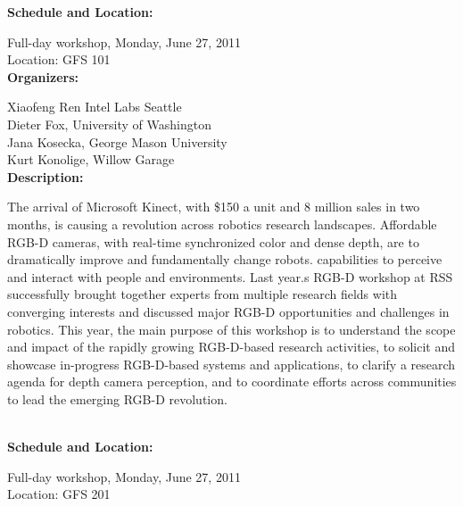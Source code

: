 {{\bf  Schedule and Location:}

Full-day workshop, Monday, June 27, 2011\\
Location: GFS 101 \\[4mm]

{\bf  Organizers:}

Xiaofeng Ren Intel Labs Seattle\\
Dieter Fox, University of Washington\\
Jana Kosecka, George Mason University\\
Kurt Konolige, Willow Garage\\[4mm]

{\bf Description: }

The arrival of Microsoft Kinect, with \$150 a unit and 8 million sales in two months, is causing a revolution across robotics research landscapes. Affordable RGB-D cameras, with real-time synchronized color and dense depth, are to dramatically improve and fundamentally change robots. capabilities to perceive and interact with people and environments. Last year.s RGB-D workshop at RSS successfully brought together experts from multiple research fields with converging interests and discussed major RGB-D opportunities and challenges in robotics. This year, the main purpose of this workshop is to understand the scope and impact of the rapidly growing RGB-D-based research activities, to solicit and showcase in-progress RGB-D-based systems and applications, to clarify a research agenda for depth camera perception, and to coordinate efforts across communities to lead the emerging RGB-D revolution.



\\[5mm]

{\bf  Schedule and Location:}

Full-day workshop, Monday, June 27, 2011\\
Location: GFS 201 \\[4mm]

}
